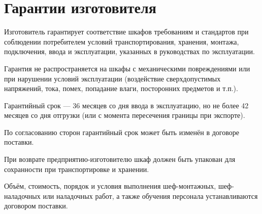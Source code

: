 {\color{unimain}\section[Гарантии изготовителя]{Гарантии изготовителя}\color{black}}

\begin{enumsec}
  \item Изготовитель гарантирует соответствие шкафов требованиям \ManualTechSpec и стандартов при соблюдении потребителем условий транспортирования, хранения, монтажа, подключения, ввода и эксплуатации, указанных в руководствах по эксплуатации.
  \item Гарантия не распространяется на шкафы с механическими повреждениями или при нарушении условий эксплуатации (воздействие сверхдопустимых напряжений, тока, помех, попадание влаги, посторонних предметов и т.п.).
  \item Гарантийный срок — 36 месяцев со дня ввода в эксплуатацию, но не более 42 месяцев со дня отгрузки (или с момента пересечения границы при экспорте).
  \item По согласованию сторон гарантийный срок может быть изменён в договоре поставки.
  \item При возврате предприятию-изготовителю шкаф должен быть упакован для сохранности при транспортировке и хранении.
  \item Объём, стоимость, порядок и условия выполнения шеф-монтажных, шеф-наладочных или наладочных работ, а также обучения персонала устанавливаются договором поставки.
\end{enumsec}
